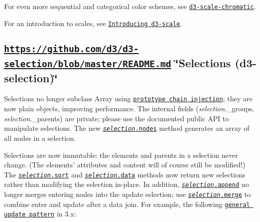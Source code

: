 \href{https://github.com/d3/d3-scale/blob/master/README.md#interpolateCubehelixDefault}{\tt } \href{https://github.com/d3/d3-scale/blob/master/README.md#interpolateRainbow}{\tt } \href{https://github.com/d3/d3-scale/blob/master/README.md#interpolateWarm}{\tt } \href{https://github.com/d3/d3-scale/blob/master/README.md#interpolateCool}{\tt }

For even more sequential and categorical color schemes, see \href{https://github.com/d3/d3-scale-chromatic}{\tt d3-\/scale-\/chromatic}.

For an introduction to scales, see \href{https://medium.com/@mbostock/introducing-d3-scale-61980c51545f}{\tt Introducing d3-\/scale}.

\subsection*{\href{https://github.com/d3/d3-selection/blob/master/README.md}{\tt https\+://github.\+com/d3/d3-\/selection/blob/master/\+R\+E\+A\+D\+M\+E.\+md} \char`\"{}\+Selections (d3-\/selection)\char`\"{}}

Selections no longer subclass Array using \href{http://perfectionkills.com/how-ecmascript-5-still-does-not-allow-to-subclass-an-array/#wrappers_prototype_chain_injection}{\tt prototype chain injection}; they are now plain objects, improving performance. The internal fields ({\itshape selection}.\+\_\+groups, {\itshape selection}.\+\_\+parents) are private; please use the documented public A\+PI to manipulate selections. The new \href{https://github.com/d3/d3-selection/blob/master/README.md#selection_nodes}{\tt {\itshape selection}.nodes} method generates an array of all nodes in a selection.

Selections are now immutable\+: the elements and parents in a selection never change. (The elements’ attributes and content will of course still be modified!) The \href{https://github.com/d3/d3-selection/blob/master/README.md#selection_sort}{\tt {\itshape selection}.sort} and \href{https://github.com/d3/d3-selection/blob/master/README.md#selection_data}{\tt {\itshape selection}.data} methods now return new selections rather than modifying the selection in-\/place. In addition, \href{https://github.com/d3/d3-selection/blob/master/README.md#selection_append}{\tt {\itshape selection}.append} no longer merges entering nodes into the update selection; use \href{https://github.com/d3/d3-selection/blob/master/README.md#selection_merge}{\tt {\itshape selection}.merge} to combine enter and update after a data join. For example, the following \href{https://bl.ocks.org/mbostock/a8a5baa4c4a470cda598}{\tt general update pattern} in 3.\+x\+:


